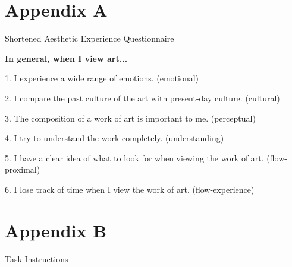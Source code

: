 \documentclass[../main.tex]{subfiles}
\begin{document}
\appendix
\section*{Appendix A} \par
\begin{center}
	Shortened Aesthetic Experience Questionnaire
\end{center}
\label{appendix:a}

	
	\textbf{In general, when I view art...}
		
	1. I experience a wide range of emotions. (emotional)
	
	2. I compare the past culture of the art with present-day culture. (cultural)
	
	3. The composition of a work of art is important to me. (perceptual)
	
	
	4. I try to understand the work completely. (understanding)
	
	
	5. I have a clear idea of what to look for when viewing the work of art. (flow-proximal)
	
	
	6. I lose track of time when I view the work of art. (flow-experience)

\newpage

\appendix
\section*{Appendix B} \par 
\begin{center}
	Task Instructions
\end{center}
\label{appendix:b}
\end{document}
